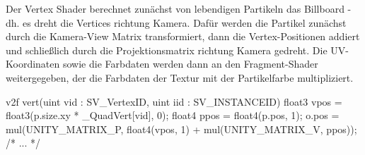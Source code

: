Der Vertex Shader berechnet zunächst von lebendigen Partikeln das Billboard - dh. es dreht die Vertices richtung Kamera. Dafür werden die Partikel zunächst durch die Kamera-View Matrix transformiert, dann die Vertex-Positionen addiert und schließlich durch die Projektionsmatrix richtung Kamera gedreht. Die UV-Koordinaten sowie die Farbdaten werden dann an den Fragment-Shader weitergegeben, der die Farbdaten der Textur mit der Partikelfarbe multipliziert.

\begin{hlsl}[caption=Unlit Billboard Shader]
v2f vert(uint vid : SV_VertexID, uint iid : SV_INSTANCEID)
{
    float3 vpos = float3(p.size.xy * _QuadVert[vid], 0);
    float4 ppos = float4(p.pos, 1);
    o.pos = mul(UNITY_MATRIX_P, float4(vpos, 1) + mul(UNITY_MATRIX_V, ppos));
    /* ... */
}
\end{hlsl}

